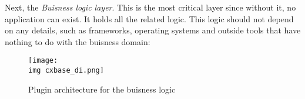 %

%
%
%
%

Next, the \textit{Buisness logic layer}. This is the most critical layer since
without it, no \connectx application can exist. It holds all the \connectx
related logic. This logic should not depend on any details, such as frameworks,
operating systems and outside tools that have nothing to do with the buisness
domain:

\begin{figure}[H]
    \begin{center}
        \texttt{[image: \\img cxbase\_di.png]}
    \end{center}
\caption{\connectx Plugin architecture for the buisness logic}
\label{imgBuisnessPlugins}
\end{figure}
